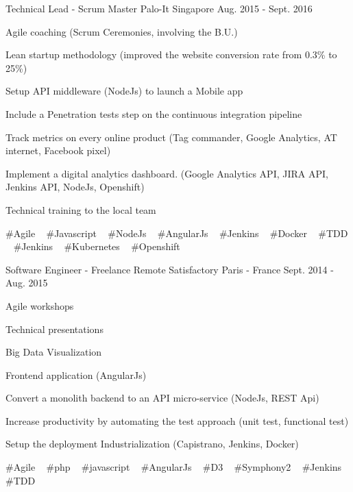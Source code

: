 \begin{cventries}
  \cventry
    {Technical Lead - Scrum Master} %
    {Palo-It} %
    {Singapore} %
    {Aug. 2015 - Sept. 2016} %
    {
      \begin{cvitems} %
        \item {Agile coaching (Scrum Ceremonies, involving the B.U.)}
        \item {Lean startup methodology (improved the website conversion rate from 0.3\% to 25\%) }
        \item {Setup API middleware (NodeJs) to launch a Mobile app}
        \item {Include a Penetration tests step on the continuous integration pipeline}
        \item {Track metrics on every online product (Tag commander, Google Analytics, AT internet, Facebook pixel)}
        \item {Implement a digital analytics dashboard. (Google Analytics API, JIRA API, Jenkins API, NodeJs, Openshift)}
        \item {Technical training to the local team}
      \end{cvitems}
    }
    {
      \#Agile ~
      \#Javascript ~
      \#NodeJs ~
      \#AngularJs ~
      \#Jenkins ~
      \#Docker ~
      \#TDD ~
      \#Jenkins ~
      \#Kubernetes ~
      \#Openshift
    }

  \cventry
    {Software Engineer - Freelance Remote} %
    {Satisfactory} %
    {Paris - France} %
    {Sept. 2014 - Aug. 2015} %
    {
      \begin{cvitems} %
        \item {Agile workshops}
        \item {Technical presentations}
        \item {Big Data Visualization}
        \item {Frontend application (AngularJs)}
        \item {Convert a monolith backend to an API micro-service (NodeJs, REST Api)}
        \item {Increase productivity by automating the test approach (unit test, functional test)}
        \item {Setup the deployment Industrialization (Capistrano, Jenkins, Docker)}
      \end{cvitems}
    }
    {
      \#Agile ~
      \#php ~
      \#javascript ~
      \#AngularJs ~
      \#D3 ~
      \#Symphony2 ~
      \#Jenkins ~
      \#TDD 
    }


\end{cventries}
